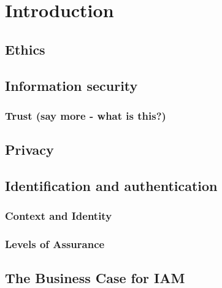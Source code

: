 \hypertarget{introduction}{%
\chapter{Introduction}\label{introduction}}

\hypertarget{ethics}{%
\section{Ethics}\label{ethics}}

\hypertarget{information-security}{%
\section{Information security}\label{information-security}}

\hypertarget{trust-say-more---what-is-this}{%
\subsection{Trust (say more - what is
this?)}\label{trust-say-more---what-is-this}}

\hypertarget{privacy}{%
\section{Privacy}\label{privacy}}

\hypertarget{identification-and-authentication}{%
\section{Identification and
authentication}\label{identification-and-authentication}}

\hypertarget{context-and-identity}{%
\subsection{Context and Identity}\label{context-and-identity}}

\hypertarget{levels-of-assurance}{%
\subsection{Levels of Assurance}\label{levels-of-assurance}}

\hypertarget{the-business-case-for-iam}{%
\section{The Business Case for IAM}\label{the-business-case-for-iam}}


